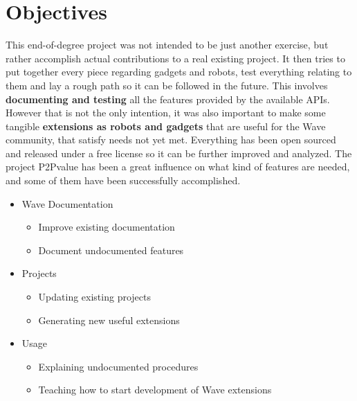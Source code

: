 \section{Objectives}
This end-of-degree project was not intended to be just another exercise, but rather accomplish actual contributions to a real existing project. It then tries to put together every piece regarding gadgets and robots, test everything relating to them and lay a rough path so it can be followed in the future. This involves \textbf{documenting and testing} all the features provided by the available APIs.\\[.2cm]
However that is not the only intention, it was also important to make some tangible \textbf{extensions as robots and gadgets} that are useful for the Wave community, that satisfy needs not yet met. Everything has been open sourced and released under a free license \cite{ref:agpl} so it can be further improved and analyzed. The project P2Pvalue \cite{ref:p2pvalue} has been a great influence on what kind of features are needed, and some of them have been successfully accomplished.
\begin{itemize}
  \item {
    Wave Documentation
    \begin{itemize}
      \item Improve existing documentation
      \item Document undocumented features
    \end{itemize}
  }
  \item {
    Projects
    \begin{itemize}
      \item Updating existing projects
      \item Generating new useful extensions
    \end{itemize}
  }
  \item {
    Usage
    \begin{itemize}
      \item Explaining undocumented procedures
      \item Teaching how to start development of Wave extensions
    \end{itemize}
  }
\end{itemize}

